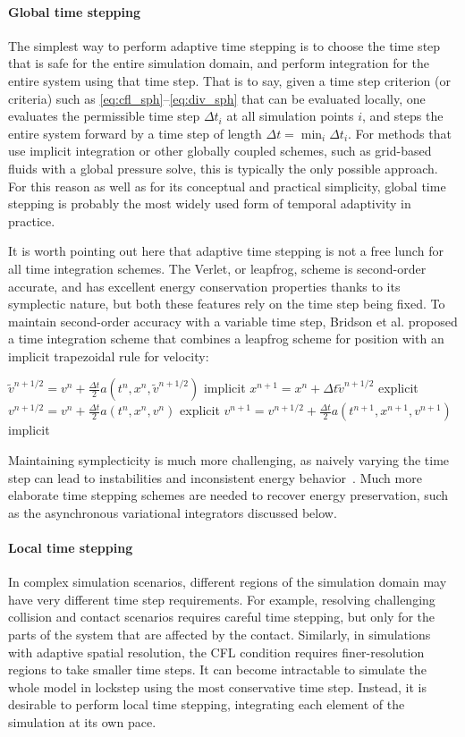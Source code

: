 \paragraph*{Global time stepping}

The simplest way to perform adaptive time stepping is to choose the time step that is safe for the entire simulation domain, and perform integration for the entire system using that time step.
That is to say, given a time step criterion (or criteria) such as \eqref{eq:cfl_sph}--\eqref{eq:div_sph} that can be evaluated locally, one evaluates the permissible time step $\Delta t_i$ at all simulation points $i$, and steps the entire system forward by a time step of length $\Delta t = \min_i \Delta t_i$.
For methods that use implicit integration or other globally coupled schemes, such as grid-based fluids with a global pressure solve, this is typically the only possible approach.
For this reason as well as for its conceptual and practical simplicity, global time stepping is probably the most widely used form of temporal adaptivity in practice.

It is worth pointing out here that adaptive time stepping is not a free lunch for all time integration schemes.
The Verlet, or leapfrog, scheme is second-order accurate, and has excellent energy conservation properties thanks to its symplectic nature, but both these features rely on the time step being fixed.
To maintain second-order accuracy with a variable time step, Bridson et al. \cite{Bridson2003} proposed a time integration scheme that combines a leapfrog scheme for position with an implicit trapezoidal rule for velocity:
\smallskip
\begin{algorithmic}[1]
\State $\tilde v^{n+1/2} = v^n + \frac{\Delta t}2 a(t^n, x^n, \tilde v^{n+1/2})$ \Comment implicit
\State $x^{n+1} = x^n + \Delta t\tilde v^{n+1/2}$ \Comment explicit
\State $v^{n+1/2} = v^n + \frac{\Delta t}2 a(t^n, x^n, v^n)$ \Comment explicit
\State $v^{n+1} = v^{n+1/2} + \frac{\Delta t}2 a(t^{n+1}, x^{n+1}, v^{n+1})$ \Comment implicit
\end{algorithmic}
Maintaining symplecticity is much more challenging, as naively varying the time step can lead to instabilities and inconsistent energy behavior~\cite{Harmon2009}.
Much more elaborate time stepping schemes are needed to recover energy preservation, such as the asynchronous variational integrators discussed below.

\paragraph*{Local time stepping}
In complex simulation scenarios, different regions of the simulation domain may have very different time step requirements.
For example, resolving challenging collision and contact scenarios requires careful time stepping, but only for the parts of the system that are affected by the contact.
Similarly, in simulations with adaptive spatial resolution, the CFL condition requires finer-resolution regions to take smaller time steps.
It can become intractable to simulate the whole model in lockstep using the most conservative time step.
Instead, it is desirable to perform local time stepping, integrating each element of the simulation at its own pace.

